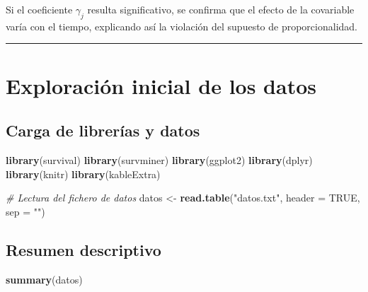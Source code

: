 \documentclass[
]{article}
\newenvironment{Shaded}{\begin{snugshade}}{\end{snugshade}}
\newcommand{\AttributeTok}[1]{\textcolor[rgb]{0.13,0.29,0.53}{#1}}
\newcommand{\CommentTok}[1]{\textcolor[rgb]{0.56,0.35,0.01}{\textit{#1}}}
\newcommand{\ConstantTok}[1]{\textcolor[rgb]{0.56,0.35,0.01}{#1}}
\newcommand{\FunctionTok}[1]{\textcolor[rgb]{0.13,0.29,0.53}{\textbf{#1}}}
\newcommand{\NormalTok}[1]{#1}
\newcommand{\OtherTok}[1]{\textcolor[rgb]{0.56,0.35,0.01}{#1}}
\newcommand{\StringTok}[1]{\textcolor[rgb]{0.31,0.60,0.02}{#1}}
\begin{document}
Si el coeficiente \(\gamma_j\) resulta significativo, se confirma que el
efecto de la covariable varía con el tiempo, explicando así la violación
del supuesto de proporcionalidad.

\begin{center}\rule{0.5\linewidth}{0.5pt}\end{center}

\hypertarget{exploraciuxf3n-inicial-de-los-datos}{%
\section{Exploración inicial de los
datos}\label{exploraciuxf3n-inicial-de-los-datos}}

\hypertarget{carga-de-libreruxedas-y-datos}{%
\subsection{Carga de librerías y
datos}\label{carga-de-libreruxedas-y-datos}}

\begin{Shaded}
\begin{Highlighting}[]
\FunctionTok{library}\NormalTok{(survival)}
\FunctionTok{library}\NormalTok{(survminer)}
\FunctionTok{library}\NormalTok{(ggplot2)}
\FunctionTok{library}\NormalTok{(dplyr)}
\FunctionTok{library}\NormalTok{(knitr)}
\FunctionTok{library}\NormalTok{(kableExtra)}
\end{Highlighting}
\end{Shaded}

\begin{Shaded}
\begin{Highlighting}[]
\CommentTok{\# Lectura del fichero de datos}
\NormalTok{datos }\OtherTok{\textless{}{-}} \FunctionTok{read.table}\NormalTok{(}\StringTok{"datos.txt"}\NormalTok{, }\AttributeTok{header =} \ConstantTok{TRUE}\NormalTok{, }\AttributeTok{sep =} \StringTok{""}\NormalTok{)}
\end{Highlighting}
\end{Shaded}

\hypertarget{resumen-descriptivo}{%
\subsection{Resumen descriptivo}\label{resumen-descriptivo}}

\begin{Shaded}
\begin{Highlighting}[]
\FunctionTok{summary}\NormalTok{(datos)}
\end{Highlighting}
\end{Shaded}
\end{document}
